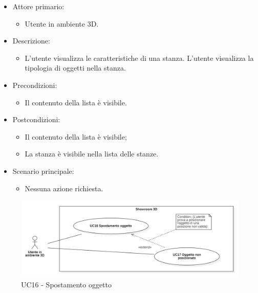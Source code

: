 \begin{itemize}

	\item Attore primario: 
	\begin{itemize}
		\item Utente in ambiente 3D.
	\end{itemize}
	\item Descrizione:
	\begin{itemize}
		\item L'utente visualizza le caratteristiche di una stanza.
		\newline L'utente visualizza la tipologia di oggetti nella stanza.
	\end{itemize}
	
	\item Precondizioni:
	\begin{itemize}
		\item Il contenuto della lista è visibile.
	\end{itemize}
	
	\item Postcondizioni:
	\begin{itemize}
		\item Il contenuto della lista è visibile;
		\item La stanza è visibile nella lista delle stanze.
	\end{itemize}
	
	\item Scenario principale:
	\begin{itemize}
		\item Nessuna azione richiesta.
	\end{itemize}
	
\end{itemize}

\pagebreak

\begin{figure}[H]
  \renewcommand{\thefigure}{20}
  \includegraphics[width=\linewidth]{./res/images/UC16-17.png}
  \caption{UC16 - Spostamento oggetto}
  \label{fig:UC 16 e 17}
\end{figure}

